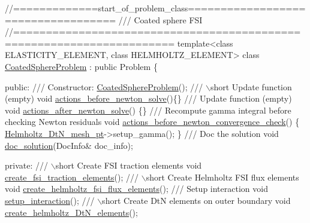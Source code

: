  
\begin{DoxyCodeInclude}
\textcolor{comment}{//=============start\_of\_problem\_class===================================}
\textcolor{comment}{/// Coated sphere FSI}
\textcolor{comment}{}\textcolor{comment}{//====================================================================== }
\textcolor{keyword}{template}<\textcolor{keyword}{class} ELASTICITY\_ELEMENT, \textcolor{keyword}{class} HELMHOLTZ\_ELEMENT>
\textcolor{keyword}{class }\hyperlink{classCoatedSphereProblem}{CoatedSphereProblem} : \textcolor{keyword}{public} Problem
\{

\textcolor{keyword}{public}:
\textcolor{comment}{}
\textcolor{comment}{ /// Constructor:}
\textcolor{comment}{} \hyperlink{classCoatedSphereProblem_ab9c983e7f0bed66f13d59bd65d6d151b}{CoatedSphereProblem}();
 \textcolor{comment}{}
\textcolor{comment}{ /// \(\backslash\)short Update function (empty)}
\textcolor{comment}{} \textcolor{keywordtype}{void} \hyperlink{classCoatedSphereProblem_aa268009485d4d2bb6b4856bfa318aaa9}{actions\_before\_newton\_solve}()\{\}
\textcolor{comment}{}
\textcolor{comment}{ /// Update function (empty)}
\textcolor{comment}{} \textcolor{keywordtype}{void} \hyperlink{classCoatedSphereProblem_ae5287efab54b16ec1bd5cced98971c9c}{actions\_after\_newton\_solve}() \{\}
 \textcolor{comment}{}
\textcolor{comment}{ /// Recompute gamma integral before checking Newton residuals}
\textcolor{comment}{} \textcolor{keywordtype}{void} \hyperlink{classCoatedSphereProblem_a2f55bc904971ca96eb9af3451ef5b4c4}{actions\_before\_newton\_convergence\_check}()
  \{
   \hyperlink{classCoatedSphereProblem_abb33720ab0a096c5e1d6be33310bff21}{Helmholtz\_DtN\_mesh\_pt}->setup\_gamma();
  \}
  \textcolor{comment}{}
\textcolor{comment}{ /// Doc the solution}
\textcolor{comment}{} \textcolor{keywordtype}{void} \hyperlink{classCoatedSphereProblem_aaeade2a110160c002b2b45954a5a0edc}{doc\_solution}(DocInfo& doc\_info);

\textcolor{keyword}{private}:
\textcolor{comment}{}
\textcolor{comment}{ /// \(\backslash\)short Create FSI traction elements}
\textcolor{comment}{} \textcolor{keywordtype}{void} \hyperlink{classCoatedSphereProblem_a2d342158b3058cd5392e2de3fd7595da}{create\_fsi\_traction\_elements}();
\textcolor{comment}{}
\textcolor{comment}{ /// \(\backslash\)short Create Helmholtz FSI flux elements}
\textcolor{comment}{} \textcolor{keywordtype}{void} \hyperlink{classCoatedSphereProblem_a9a301689052eefd53552aadc23ff893b}{create\_helmholtz\_fsi\_flux\_elements}(); 
\textcolor{comment}{}
\textcolor{comment}{ /// Setup interaction}
\textcolor{comment}{} \textcolor{keywordtype}{void} \hyperlink{classCoatedSphereProblem_aeea43c892871a6c65df992aedc3b3547}{setup\_interaction}();
\textcolor{comment}{}
\textcolor{comment}{ /// \(\backslash\)short Create DtN elements on outer boundary}
\textcolor{comment}{} \textcolor{keywordtype}{void} \hyperlink{classCoatedSphereProblem_a867f4ed706f00a73c87c2c862dcf19c3}{create\_helmholtz\_DtN\_elements}();

\end{DoxyCodeInclude}


